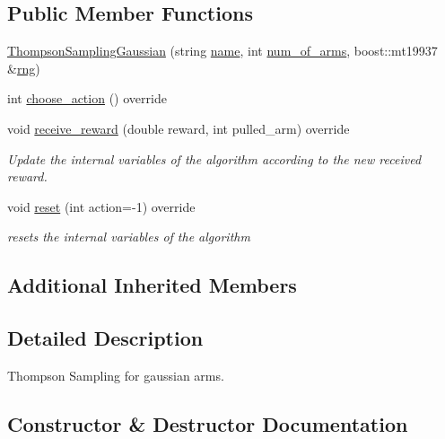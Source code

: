 \subsection*{Public Member Functions}
\begin{DoxyCompactItemize}
\item 
\mbox{\hyperlink{class_thompson_sampling_gaussian_a52540125c2391c76e5b176054c3fa2e7}{Thompson\+Sampling\+Gaussian}} (string \mbox{\hyperlink{class_m_a_b_algorithm_a77b10ecc4b49d519c557f65358167b82}{name}}, int \mbox{\hyperlink{class_m_a_b_algorithm_a340fa9e83e85b092f2c6125fc4e8549b}{num\+\_\+of\+\_\+arms}}, boost\+::mt19937 \&\mbox{\hyperlink{class_thompson_sampling_a1b66efa9bb0912df92975147f8923216}{rng}})
\item 
int \mbox{\hyperlink{class_thompson_sampling_gaussian_a36e15e9a5d9f5cae94fef686c2cbb4be}{choose\+\_\+action}} () override
\item 
void \mbox{\hyperlink{class_thompson_sampling_gaussian_a21d02f760e6738a8e209f46e57ffa341}{receive\+\_\+reward}} (double reward, int pulled\+\_\+arm) override
\begin{DoxyCompactList}\small\item\em Update the internal variables of the algorithm according to the new received reward. \end{DoxyCompactList}\item 
void \mbox{\hyperlink{class_thompson_sampling_gaussian_a847a421af9da4c81c10c395ebde1d8c8}{reset}} (int action=-\/1) override
\begin{DoxyCompactList}\small\item\em resets the internal variables of the algorithm \end{DoxyCompactList}\end{DoxyCompactItemize}
\subsection*{Additional Inherited Members}


\subsection{Detailed Description}
Thompson Sampling for gaussian arms. 

\subsection{Constructor \& Destructor Documentation}
\mbox{\label{class_thompson_sampling_gaussian_a52540125c2391c76e5b176054c3fa2e7}} 
